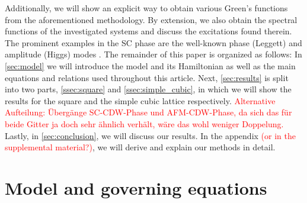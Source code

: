\documentclass[iicol,sn-mathphys,Numbered]{sn-jnl}%
\theoremstyle{thmstyleone}%
\theoremstyle{thmstyletwo}%
\theoremstyle{thmstylethree}%
\begin{document}
Additionally, we will show an explicit way to obtain various Green's functions from the aforementioned methodology.
By extension, we also obtain the spectral functions of the investigated systems and discuss the excitations found therein.
The prominent examples in the SC phase are the well-known phase (Leggett) and amplitude (Higgs) modes \cite{Cea14,Krull16,Schwarz20,Fan22}.
\newline
The remainder of this paper is organized as follows:
In \autoref{sec:model} we will introduce the model and its Hamiltonian as well as the main equations and relations used throughout this article.
Next, \autoref{sec:results} is split into two parts, \autoref{ssec:square} and \autoref{ssec:simple_cubic}, 
in which we will show the results for the square and the simple cubic lattice respectively.
\textcolor{red}{Alternative Aufteilung: Übergänge SC-CDW-Phase und AFM-CDW-Phase, da sich das für beide Gitter ja doch sehr ähnlich verhält, wäre das wohl weniger Doppelung.}
Lastly, in \autoref{sec:conclusion}, we will discuss our results.
In the appendix \textcolor{red}{(or in the supplemental material?)}, we will derive and explain our methods in detail.

\section{Model and governing equations}\label{sec:model}
\end{document}
